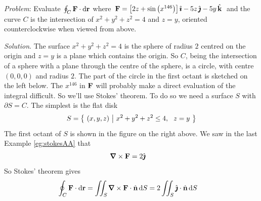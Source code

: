 \begin{eg}\label{eg:stokesA}
\noindent\textit{Problem}:
Evaluate
$
\oint_C\mathbf{F}\cdot\mathrm{d}\mathbf{r}
$
where $\mathbf{F}= \big[2z+\sin\big(x^{146}\big)\big]\,\hat{\pmb{\imath}}-5z\,\hat{\pmb{\jmath}} -5y\,\hat{\mathbf{k}}$ 
and the curve $C$ is the intersection of $x^2+y^2+z^2=4$ 
and $z=y$, oriented counterclockwise when viewed from above.

\medskip
\noindent\textit{Solution}. 
The surface $x^2+y^2+z^2=4$ is the sphere of radius $2$ centred on the origin
and $z=y$ is a plane which contains the origin. So $C$, being the 
intersection of a sphere with a plane through the centre of the sphere,
is a circle, with centre $(0,0,0)$ and radius $2$. The part of the circle
in the first octant is sketched on the left below.
The $x^{146}$ in $\mathbf{F}$ will probably make a direct evaluation of the
integral difficult. So we'll use Stokes' theorem. To do so we need
a surface $S$ with $\partial S=C$. The simplest is the flat
disk
\begin{equation*}
S = \big\{ \ (x,y,z)\ \big|\  x^2+y^2+z^2\le 4,\ \ z=y\ \big\}
\end{equation*}
The first octant of $S$ is shown in the figure on the right above.
We saw in the last Example \ref{eg:stokesAA} that
\begin{align*}
\vnabla\times\vF &=2\hj
\end{align*}
So Stokes' theorem gives
\begin{align*}
\oint_C\vF\cdot\dee{\vr}
& = \dblInt_S \vnabla\times\vF\cdot\hn\,\dee{S}
 = 2\dblInt_S \hj\cdot\hn\,\dee{S}
\end{align*}


\end{eg}
